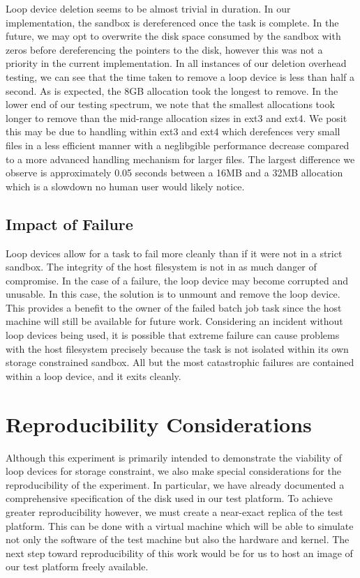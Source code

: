 \documentclass[conference]{IEEEtran}
\begin{document}
Loop device deletion seems to be almost trivial in duration. In our implementation, the sandbox is dereferenced once the task is complete. In the future, we may opt to overwrite the disk space consumed by the sandbox with zeros before dereferencing the pointers to the disk, however this was not a priority in the current implementation. In all instances of our deletion overhead testing, we can see that the time taken to remove a loop device is less than half a second. As is expected, the 8GB allocation took the longest to remove. In the lower end of our testing spectrum, we note that the smallest allocations took longer to remove than the mid-range allocation sizes in ext3 and ext4. We posit this may be due to handling within ext3 and ext4 which derefences very small files in a less efficient manner with a neglibgible performance decrease compared to a more advanced handling mechanism for larger files. The largest difference we observe is approximately 0.05 seconds between a 16MB and a 32MB allocation which is a slowdown no human user would likely notice.

\subsection{Impact of Failure}
Loop devices allow for a task to fail more cleanly than if it were not in a strict sandbox. The integrity of the host filesystem is not in as much danger of compromise. In the case of a failure, the loop device may become corrupted and unusable. In this case, the solution is to unmount and remove the loop device. This provides a benefit to the owner of the failed batch job task since the host machine will still be available for future work. Considering an incident without loop devices being used, it is possible that extreme failure can cause problems with the host filesystem precisely because the task is not isolated within its own storage constrained sandbox. All but the most catastrophic failures are contained within a loop device, and it exits cleanly.

\section{Reproducibility Considerations}
Although this experiment is primarily intended to demonstrate the viability of loop devices for storage constraint, we also make special considerations for the reproducibility of the experiment. In particular, we have already documented a comprehensive specification of the disk used in our test platform. To achieve greater reproducibility however, we must create a near-exact replica of the test platform. This can be done with a virtual machine which will be able to simulate not only the software of the test machine but also the hardware and kernel. The next step toward reproducibility of this work would be for us to host an image of our test platform freely available.
\end{document}
